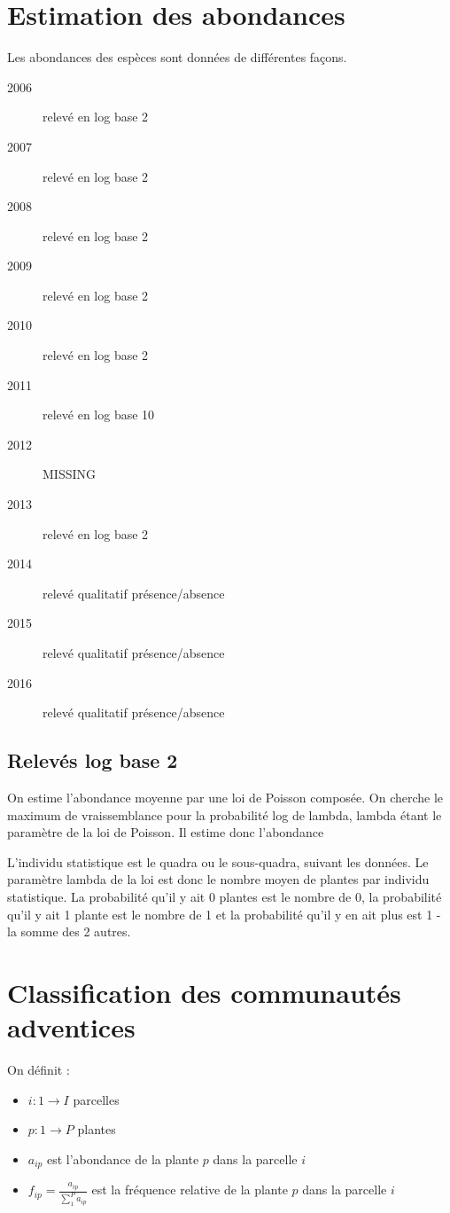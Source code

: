 \documentclass[a4paper, 12pt]{article}
\begin{document}
\section{Estimation des abondances}

Les abondances des espèces sont données de différentes façons.

\begin{description}
  \item[2006] relevé en log base 2
  \item[2007] relevé en log base 2
  \item[2008] relevé en log base 2
  \item[2009] relevé en log base 2
  \item[2010] relevé en log base 2
  \item[2011] relevé en log base 10
  \item[2012] MISSING
  \item[2013] relevé en log base 2
  \item[2014] relevé qualitatif présence/absence
  \item[2015] relevé qualitatif présence/absence
  \item[2016] relevé qualitatif présence/absence
\end{description}

\subsection{Relevés log base 2}

On estime l'abondance moyenne par une loi de Poisson composée.
On cherche le maximum de vraissemblance pour la probabilité log de lambda,
lambda étant le paramètre de la loi de Poisson.
Il estime donc l'abondance 

L'individu statistique est le quadra ou le sous-quadra, suivant les données.
Le paramètre lambda de la loi est donc le nombre moyen de plantes par individu
statistique.
La probabilité qu'il y ait 0 plantes est le nombre de 0, la probabilité qu'il y
ait 1 plante est le nombre de 1 et la probabilité qu'il y en ait plus est 1 - la
somme des 2 autres.


\section{Classification des communautés adventices}

On définit :

\begin{itemize}
  \item $ i : 1 \to I $ parcelles
  \item $ p : 1 \to P $ plantes
  \item $ a_{ip} $ est l'abondance de la plante $p$ dans la parcelle $i$
  \item $f_{ip} = \frac{a_{ip}}{\sum_{1}^{P} a_{ip}}$ est la fréquence relative
    de la plante $p$ dans la parcelle $i$
\end{itemize}
\end{document}
